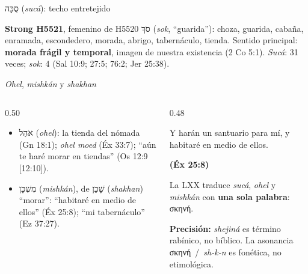 \documentclass[hyperref={bookmarks=false},aspectratio=169]{beamer}
\newcommand{\heb}[1]{\mbox{\foreignlanguage{hebrew}{#1}}}
\newcommand{\grc}[1]{\foreignlanguage{ancientgreek}{#1}}
\newcommand{\fuente}[1]{\par\hfill{\upshape\bfseries\footnotesize\textcolor{tierraroja}{#1}}}
\newcommand{\destacar}[1]{\textbf{\textcolor{tierraroja}{#1}}}
\newcommand{\precision}[1]{{\footnotesize\color{sepia}\textbf{Precisión:} #1}}
\begin{document}
\begin{frame}{\heb{סֻכָּה} (\emph{sucá}): techo entretejido}
\centering
{}\par\smallskip
\scriptsize \textbf{Strong H5521}, femenino de H5520 \heb{סֹךְ} (\emph{sok}, ``guarida''): choza, guarida, cabaña, enramada, escondedero, morada, abrigo, tabernáculo, tienda. Sentido principal: \destacar{morada frágil y temporal}, imagen de nuestra existencia (2 Co 5:1). \emph{Sucá}: 31 veces; \emph{sok}: 4 (Sal 10:9; 27:5; 76:2; Jer 25:38).
\end{frame}

\begin{frame}{\emph{Ohel}, \emph{mishkán} y \emph{shakhan}}
\begin{columns}[t,onlytextwidth]
\begin{column}{0.50\textwidth}\small
\begin{itemize}
\item \heb{אֹהֶל} (\emph{ohel}): la tienda del nómada (Gn 18:1); \emph{ohel moed} (Éx 33:7); ``aún te haré morar en tiendas'' (Os 12:9 [12:10]).
\item \heb{מִשְׁכָּן} (\emph{mishkán}), de \heb{שָׁכַן} (\emph{shakhan}) ``morar'': ``habitaré en medio de ellos'' (Éx 25:8); ``mi tabernáculo'' (Ez 37:27).
\end{itemize}
\end{column}
\begin{column}{0.48\textwidth}
\begin{cita}Y harán un santuario para mí, y habitaré en medio de ellos.\fuente{(Éx 25:8)}\end{cita}
\scriptsize La LXX traduce \emph{sucá}, \emph{ohel} y \emph{mishkán} con \destacar{una sola palabra}: \grc{σκηνή}.\par\smallskip
\precision{\emph{shejiná} es término rabínico, no bíblico. La asonancia \grc{σκηνή}~/~\emph{sh-k-n} es fonética, no etimológica.}
\end{column}
\end{columns}
\end{frame}
\end{document}
